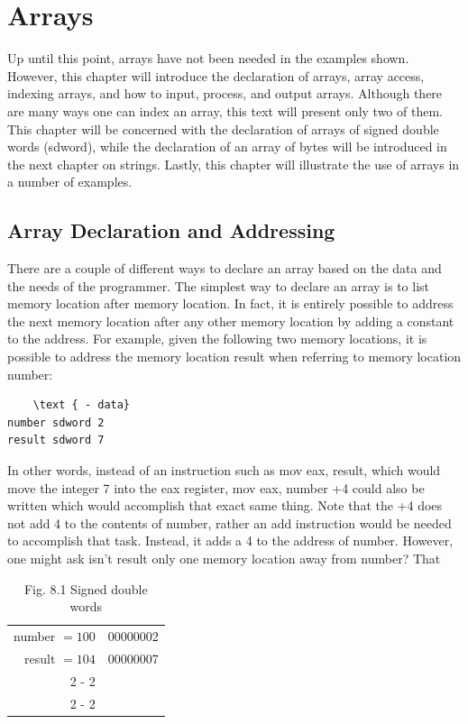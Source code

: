 \documentclass[10pt]{book}
\begin{document}
\chapter{Arrays}

Up until this point, arrays have not been needed in the examples shown. However, this chapter will introduce the declaration of arrays, array access, indexing arrays, and how to input, process, and output arrays. Although there are many ways one can index an array, this text will present only two of them. This chapter will be concerned with the declaration of arrays of signed double words (sdword), while the declaration of an array of bytes will be introduced in the next chapter on strings. Lastly, this chapter will illustrate the use of arrays in a number of examples.

\section{Array Declaration and Addressing}
There are a couple of different ways to declare an array based on the data and the needs of the programmer. The simplest way to declare an array is to list memory location after memory location. In fact, it is entirely possible to address the next memory location after any other memory location by adding a constant to the address. For example, given the following two memory locations, it is possible to address the memory location result when referring to memory location number:

\begin{verbatim}
    \text { - data}
number sdword 2
result sdword 7
\end{verbatim}

In other words, instead of an instruction such as mov eax, result, which would move the integer 7 into the eax register, mov eax, number +4 could also be written which would accomplish that exact same thing. Note that the +4 does not add 4 to the contents of number, rather an add instruction would be needed to accomplish that task. Instead, it adds a 4 to the address of number. However, one might ask isn't result only one memory location away from number? That

\begin{table}[htbp]
\begin{center}
\begin{tabular}{r|r|}
number $=100$ & 00000002 \\
result $=104$ & 00000007 \\
\cline { 2 - 2 }
 &  \\
\cline { 2 - 2 }
\end{tabular}
\captionsetup{labelformat=empty}
\caption{Fig. 8.1 Signed double words}
\end{center}
\end{table}
\end{document}
